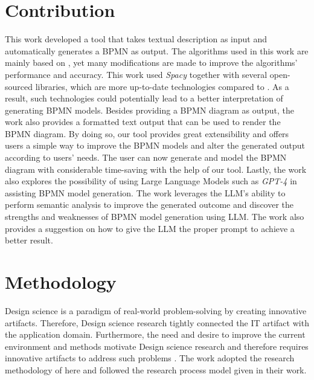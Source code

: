 \section{Contribution}
\label{sec:intro:con}


This work developed a tool that takes textual description as input and automatically generates a BPMN as output. The algorithms used in this work are mainly based on \cite{t2m_1}, yet many modifications are made to improve the algorithms' performance and accuracy. This work used \textit{Spacy} together with several open-sourced libraries, which are more up-to-date technologies compared to \cite{t2m_1}. As a result, such technologies could potentially lead to a better interpretation of generating BPMN models. Besides providing a BPMN diagram as output, the work also provides a formatted text output that can be used to render the BPMN diagram. By doing so, our tool provides great extensibility and offers users a simple way to improve the BPMN models and alter the generated output according to users' needs. The user can now generate and model the BPMN diagram with considerable time-saving with the help of our tool. Lastly, the work also explores the possibility of using Large Language Models such as \textit{GPT-4} in assisting BPMN model generation. The work leverages the LLM's ability to perform semantic analysis to improve the generated outcome and discover the strengths and weaknesses of BPMN model generation using LLM. The work also provides a suggestion on how to give the LLM the proper prompt to achieve a better result.

\section{Methodology}
\label{sec:intro:meth}

%


Design science is a paradigm of real-world problem-solving by creating innovative artifacts. Therefore, Design science research tightly connected the IT artifact with the application domain. Furthermore, the need and desire to improve the current environment and methods motivate Design science research and therefore requires innovative artifacts to address such problems \cite{DSM_1}. The work adopted the research methodology of \cite{DSM_2} here and followed the research process model given in their work.

